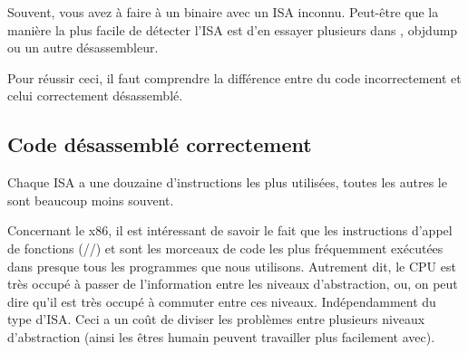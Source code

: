 ﻿
\label{ISA_detect}

Souvent, vous avez à faire à un binaire avec un \ac{ISA} inconnu.
Peut-être que la manière la plus facile de détecter l'\ac{ISA} est d'en essayer plusieurs
dans \IDA, objdump ou un autre désassembleur.

Pour réussir ceci, il faut comprendre la différence entre du code incorrectement
et celui correctement désassemblé.

\renewcommand{\CURPATH}{digging_into_code/incorrect_disassembly}


\subsection{Code désassemblé correctement}
\label{correctly_disasmed_code}

Chaque \ac{ISA} a une douzaine d'instructions les plus utilisées, toutes les autres
le sont beaucoup moins souvent.

Concernant le x86, il est intéressant de savoir le fait que les instructions d'appel
de fonctions (\PUSH/\CALL/\ADD) et \MOV sont les morceaux de code les plus fréquemment
exécutées dans presque tous les programmes que nous utilisons.
Autrement dit, le \ac{CPU} est très occupé à passer de l'information entre les niveaux
d'abstraction, ou, on peut dire qu'il est très occupé à commuter entre ces niveaux.
Indépendamment du type d'\ac{ISA}.
Ceci a un coût de diviser les problèmes entre plusieurs niveaux d'abstraction (ainsi
les êtres humain peuvent travailler plus facilement avec).

